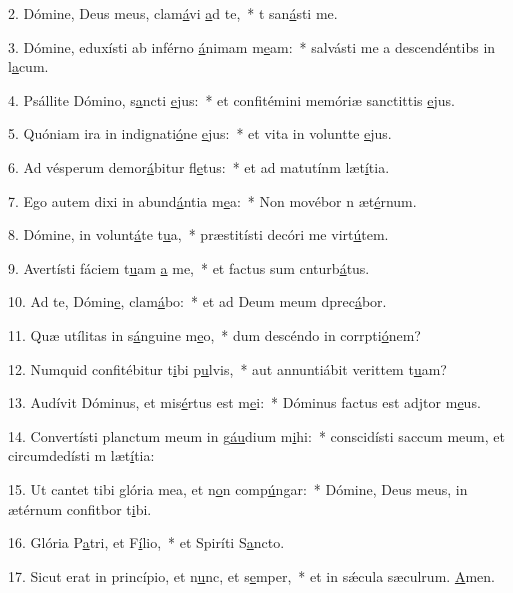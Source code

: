 2. Dómine, Deus meus, clam\uline{á}vi \uline{a}d te,~* t san\uline{á}sti me.\par 
3. Dómine, eduxísti ab inférno \uline{á}nimam m\uline{e}am:~* salvásti me a descendéntibs in l\uline{a}cum.\par 
4. Psállite Dómino, s\uline{a}ncti \uline{e}jus:~* et confitémini memóriæ sanctittis \uline{e}jus.\par 
5. Quóniam ira in indignati\uline{ó}ne \uline{e}jus:~* et vita in voluntte \uline{e}jus.\par 
6. Ad vésperum demor\uline{á}bitur fl\uline{e}tus:~* et ad matutínm læt\uline{í}tia.\par 
7. Ego autem dixi in abund\uline{á}ntia m\uline{e}a:~* Non movébor n æt\uline{é}rnum.\par 
8. Dómine, in volunt\uline{á}te t\uline{u}a,~* præstitísti decóri me virt\uline{ú}tem.\par 
9. Avertísti fáciem t\uline{u}am \uline{a} me,~* et factus sum cnturb\uline{á}tus.\par 
10. Ad te, Dómin\uline{e}, clam\uline{á}bo:~* et ad Deum meum dprec\uline{á}bor.\par 
11. Quæ utílitas in s\uline{á}nguine m\uline{e}o,~* dum descéndo in corrpti\uline{ó}nem?\par 
12. Numquid confitébitur t\uline{i}bi p\uline{u}lvis,~* aut annuntiábit verittem t\uline{u}am?\par 
13. Audívit Dóminus, et mis\uline{é}rtus est m\uline{e}i:~* Dóminus factus est adjtor m\uline{e}us.\par 
14. Convertísti planctum meum in g\uline{áu}dium m\uline{i}hi:~* conscidísti saccum meum, et circumdedísti m læt\uline{í}tia:\par 
15. Ut cantet tibi glória mea, et n\uline{o}n comp\uline{ú}ngar:~* Dómine, Deus meus, in ætérnum confitbor t\uline{i}bi.\par 
16. Glória P\uline{a}tri, et F\uline{í}lio,~* et Spiríti S\uline{a}ncto.\par 
17. Sicut erat in princípio, et n\uline{u}nc, et s\uline{e}mper,~* et in sǽcula sæculrum. \uline{A}men.\par 

